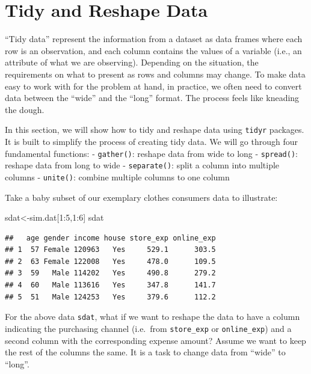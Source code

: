 \documentclass[
  12pt,
]{krantz}
\makeatletter
\newenvironment{Shaded}{\begin{snugshade}}{\end{snugshade}}
\newcommand{\DecValTok}[1]{\textcolor[rgb]{0.06,0.06,0.06}{#1}}
\newcommand{\NormalTok}[1]{#1}
\newcommand{\OtherTok}[1]{\textcolor[rgb]{0.37,0.37,0.37}{#1}}
\newcommand{\SpecialCharTok}[1]{\textcolor[rgb]{0,0,0}{#1}}
\newenvironment{kframe}{%
\medskip{}
\setlength{\fboxsep}{.8em}
 \def\at@end@of@kframe{}%
 \ifinner\ifhmode%
  \def\at@end@of@kframe{\end{minipage}}%
  \begin{minipage}{\columnwidth}%
 \fi\fi%
 \def\FrameCommand##1{\hskip\@totalleftmargin \hskip-\fboxsep
 \colorbox{shadecolor}{##1}\hskip-\fboxsep
     \hskip-\linewidth \hskip-\@totalleftmargin \hskip\columnwidth}%
 \MakeFramed {\advance\hsize-\width
   \@totalleftmargin\z@ \linewidth\hsize
   \@setminipage}}%
 {\par\unskip\endMakeFramed%
 \at@end@of@kframe}
\renewenvironment{Shaded}{\begin{kframe}}{\end{kframe}}
\makeatother
\begin{document}
\hypertarget{tidy-and-reshape-data}{%
\section{Tidy and Reshape Data}\label{tidy-and-reshape-data}}

``Tidy data'' represent the information from a dataset as data frames where each row is an observation, and each column contains the values of a variable (i.e., an attribute of what we are observing). Depending on the situation, the requirements on what to present as rows and columns may change. To make data easy to work with for the problem at hand, in practice, we often need to convert data between the ``wide'' and the ``long'' format. The process feels like kneading the dough.

In this section, we will show how to tidy and reshape data using \texttt{tidyr} packages. It is built to simplify the process of creating tidy data. We will go through four fundamental functions:
- \texttt{gather()}: reshape data from wide to long
- \texttt{spread()}: reshape data from long to wide
- \texttt{separate()}: split a column into multiple columns
- \texttt{unite()}: combine multiple columns to one column

Take a baby subset of our exemplary clothes consumers data to illustrate:

\begin{Shaded}
\begin{Highlighting}[]
\NormalTok{sdat}\OtherTok{\textless{}{-}}\NormalTok{sim.dat[}\DecValTok{1}\SpecialCharTok{:}\DecValTok{5}\NormalTok{,}\DecValTok{1}\SpecialCharTok{:}\DecValTok{6}\NormalTok{]}
\NormalTok{sdat}
\end{Highlighting}
\end{Shaded}

\begin{verbatim}
##   age gender income house store_exp online_exp
## 1  57 Female 120963   Yes     529.1      303.5
## 2  63 Female 122008   Yes     478.0      109.5
## 3  59   Male 114202   Yes     490.8      279.2
## 4  60   Male 113616   Yes     347.8      141.7
## 5  51   Male 124253   Yes     379.6      112.2
\end{verbatim}

For the above data \texttt{sdat}, what if we want to reshape the data to have a column indicating the purchasing channel (i.e.~from \texttt{store\_exp} or \texttt{online\_exp}) and a second column with the corresponding expense amount? Assume we want to keep the rest of the columns the same. It is a task to change data from ``wide'' to ``long''.
\end{document}
